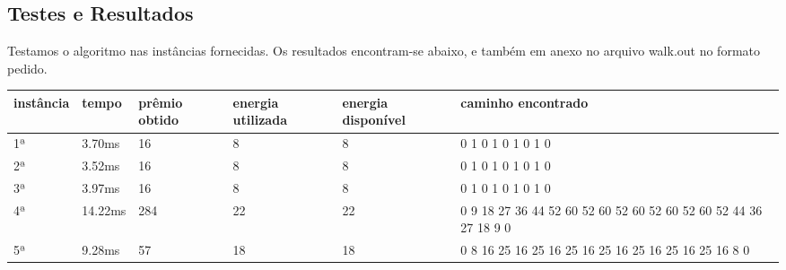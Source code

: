 \documentclass[a4paper]{article}
\begin{document}
\subsection*{Testes e Resultados}

Testamos o algoritmo nas instâncias fornecidas. Os resultados encontram-se abaixo, e também em anexo no arquivo walk.out no formato pedido.


\begin{table}[H]
\centering
\begin{tabular}{p{1.5cm}|p{1.5cm}|p{1.5cm}|p{1.5cm}|p{1.5cm}|p{4cm}}
instância & tempo & prêmio obtido & energia utilizada & energia disponível & caminho encontrado \\\hline
1ª & 3.70ms & 16 & 8 & 8 & 0 1 0 1 0 1 0 1 0 \\
2ª & 3.52ms & 16 & 8 & 8 & 0 1 0 1 0 1 0 1 0 \\
3ª & 3.97ms & 16 & 8 & 8 & 0 1 0 1 0 1 0 1 0 \\
4ª & 14.22ms & 284 & 22 & 22 & 0 9 18 27 36 44 52 60 52 60 52 60 52 60 52 60 52 44 36 27 18 9 0 \\
5ª & 9.28ms & 57 & 18 & 18 & 0 8 16 25 16 25 16 25 16 25 16 25 16 25 16 25 16 8 0

\end{tabular}
\end{table}
\end{document}
